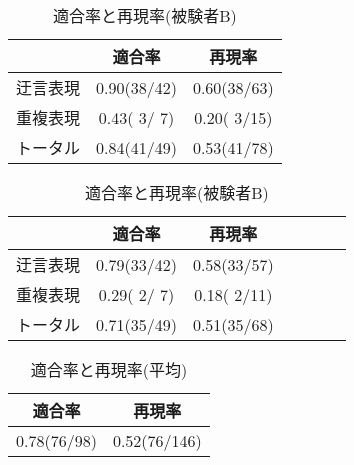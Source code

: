 \documentclass{nlp}
\begin{document}
\begin{table}[h]
 \begin{center}
  
  
  \begin{minipage}{60mm}
   \begin{center}
   \caption{適合率と再現率(被験者A)}
  \label{table:result1-1}
  \begin{tabular}{c|cc}\hline
            & 適合率            & 再現率       \\ \hline
   迂言表現 & 0.90(38/42)       & 0.60(38/63)  \\ \hline
   重複表現 & 0.43( 3/ 7)       & 0.20( 3/15)  \\ \hline
   トータル & 0.84(41/49)       & 0.53(41/78)  \\ \hline
  \end{tabular}
   \end{center}
  \end{minipage}
  
  \hspace{1mm}
  
  \begin{minipage}{60mm}
   \begin{center}
   \caption{適合率と再現率(被験者B)}
  \label{table:result1-2}
  \begin{tabular}{c|cccc|cc}\cline{1-3} \hline
            & 適合率            & 再現率            \\ \hline
   迂言表現 & 0.79(33/42)       & 0.58(33/57)       \\ \hline
   重複表現 & 0.29( 2/ 7)       & 0.18( 2/11)       \\ \hline
   トータル & 0.71(35/49)       & 0.51(35/68)       \\ \hline
  \end{tabular}
   \end{center}
   
   \end{minipage}
  
 \end{center}
\end{table}


\begin{table}[h]
 \begin{center}
  \caption{適合率と再現率(平均)}
    \label{table:result1-3}
    \begin{tabular}{c|c}\hline
    適合率            & 再現率       \\ \hline
    0.78(76/98)       & 0.52(76/146)  \\ \hline
    \end{tabular}
 \end{center}
\end{table}
\end{document}

